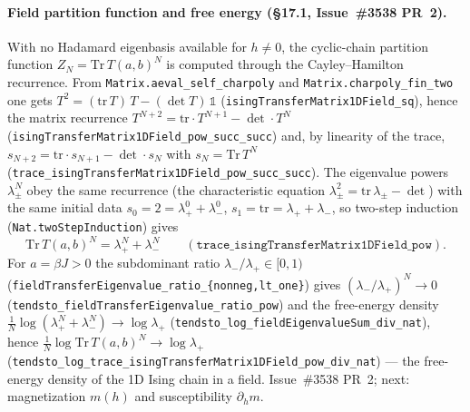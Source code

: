 \documentclass[a4paper,11pt]{article}
\begin{document}
\paragraph{Field partition function and free energy (\S17.1, Issue~\#3538 PR~2).}
With no Hadamard eigenbasis available for $h \ne 0$, the cyclic-chain partition
function $Z_N = \mathrm{Tr}\,T(a,b)^N$ is computed through the Cayley--Hamilton
recurrence. From \texttt{Matrix.aeval\_self\_charpoly} and
\texttt{Matrix.charpoly\_fin\_two} one gets
$T^2 = (\mathrm{tr}\,T)\,T - (\det T)\,\mathbb 1$
(\texttt{isingTransferMatrix1DField\_sq}), hence the matrix recurrence
$T^{N+2} = \mathrm{tr}\cdot T^{N+1} - \det\cdot T^N$
(\texttt{isingTransferMatrix1DField\_pow\_succ\_succ}) and, by linearity of the
trace, $s_{N+2} = \mathrm{tr}\cdot s_{N+1} - \det\cdot s_N$ with $s_N =
\mathrm{Tr}\,T^N$
(\texttt{trace\_isingTransferMatrix1DField\_pow\_succ\_succ}). The eigenvalue
powers $\lambda_\pm^N$ obey the same recurrence (the characteristic equation
$\lambda_\pm^2 = \mathrm{tr}\,\lambda_\pm - \det$) with the same initial data
$s_0 = 2 = \lambda_+^0 + \lambda_-^0$, $s_1 = \mathrm{tr} = \lambda_+ +
\lambda_-$, so two-step induction (\texttt{Nat.twoStepInduction}) gives
\[
  \mathrm{Tr}\,T(a,b)^N = \lambda_+^N + \lambda_-^N
  \qquad (\texttt{trace\_isingTransferMatrix1DField\_pow}).
\]
For $a = \beta J > 0$ the subdominant ratio $\lambda_-/\lambda_+ \in [0,1)$
(\texttt{fieldTransferEigenvalue\_ratio\_\{nonneg,lt\_one\}}) gives
$(\lambda_-/\lambda_+)^N \to 0$
(\texttt{tendsto\_fieldTransferEigenvalue\_ratio\_pow}) and the free-energy
density $\tfrac1N \log(\lambda_+^N + \lambda_-^N) \to \log\lambda_+$
(\texttt{tendsto\_log\_fieldEigenvalueSum\_div\_nat}), hence
$\tfrac1N \log\mathrm{Tr}\,T(a,b)^N \to \log\lambda_+$
(\texttt{tendsto\_log\_trace\_isingTransferMatrix1DField\_pow\_div\_nat}) --- the
free-energy density of the 1D Ising chain in a field. Issue~\#3538 PR~2; next:
magnetization $m(h)$ and susceptibility $\partial_h m$.
\end{document}
